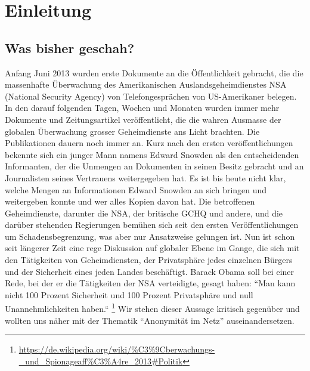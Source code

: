 \newpage
\section{Einleitung}

\subsection{Was bisher geschah?}
Anfang Juni 2013 wurden erste Dokumente an die Öffentlichkeit gebracht, die die massenhafte Überwachung des Amerikanischen Auslandsgeheimdienstes NSA (National Security Agency) von Telefongesprächen von US-Amerikaner belegen. In den darauf folgenden Tagen, Wochen und Monaten wurden immer mehr Dokumente und Zeitungsartikel veröffentlicht, die die wahren Ausmasse der globalen Überwachung grosser Geheimdienste ans Licht brachten. Die Publikationen dauern noch immer an. Kurz nach den ersten veröffentlichungen bekennte sich ein junger Mann namens Edward Snowden als den entscheidenden Informanten, der die Unmengen an Dokumenten in seinen Besitz gebracht und an Journalisten seines Vertrauens weitergegeben hat. Es ist bis heute nicht klar, welche Mengen an Informationen Edward Snowden an sich bringen und weitergeben konnte und wer alles Kopien davon hat. Die betroffenen Geheimdienste, darunter die NSA, der britische GCHQ und andere, und die darüber stehenden Regierungen bemühen sich seit den ersten Veröffentlichungen um Schadensbegrenzung, was aber nur Ansatzweise gelungen ist. Nun ist schon seit längerer Zeit eine rege Diskussion auf globaler Ebene im Gange, die sich mit den Tätigkeiten von Geheimdiensten, der Privatsphäre jedes einzelnen Bürgers und der Sicherheit eines jeden Landes beschäftigt. Barack Obama soll bei einer Rede, bei der er die Tätigkeiten der NSA verteidigte, gesagt haben: ``Man kann nicht 100 Prozent Sicherheit und 100 Prozent Privatsphäre und null Unannehmlichkeiten haben.“
\footnote{\url{https://de.wikipedia.org/wiki/\%C3\%9Cberwachungs-_und_Spionageaff\%C3\%A4re_2013\#Politik}}
Wir stehen dieser Aussage kritisch gegenüber und wollten uns näher mit der Thematik ``Anonymität im Netz'' auseinandersetzen.

